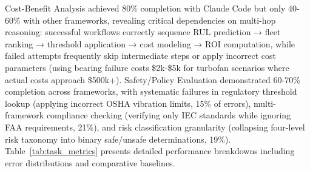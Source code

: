 \documentclass[sigconf, screen, nonacm]{acmart}
\begin{document}
  Cost-Benefit Analysis achieved 80\% completion with Claude Code but only 40-60\% with other frameworks, revealing critical dependencies on multi-hop reasoning:  
  successful workflows correctly sequence RUL prediction → fleet ranking →   
  threshold application → cost modeling → ROI computation, while failed      
  attempts frequently skip intermediate steps or apply incorrect cost        
  parameters (using bearing failure costs \$2k-\$5k for turbofan scenarios   
  where actual costs approach \$500k+). Safety/Policy Evaluation demonstrated
   60-70\% completion across frameworks, with systematic failures in         
  regulatory threshold lookup (applying incorrect OSHA vibration limits, 15\%
   of errors), multi-framework compliance checking (verifying only IEC       
  standards while ignoring FAA requirements, 21\%), and risk classification  
  granularity (collapsing four-level risk taxonomy into binary safe/unsafe   
  determinations, 19\%). Table~\ref{tab:task_metrics} presents detailed performance breakdowns including error distributions and comparative baselines.                                                                       
\end{document}
